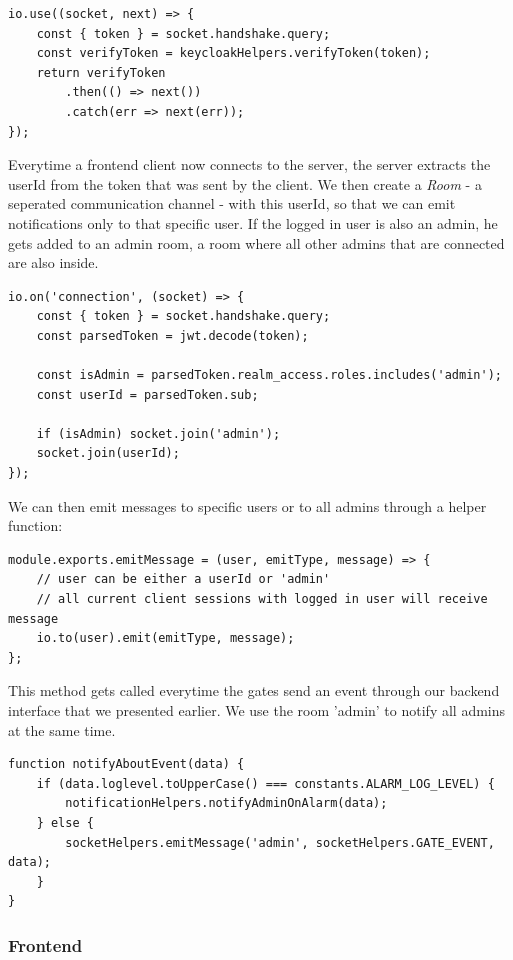 \begin{lstlisting}[label=createSocketIOMiddleware]
io.use((socket, next) => {
    const { token } = socket.handshake.query;
    const verifyToken = keycloakHelpers.verifyToken(token);
    return verifyToken
        .then(() => next())
        .catch(err => next(err));
});
\end{lstlisting}

Everytime a frontend client now connects to the server, the server extracts the userId from the token that was sent by the client. We then create a \emph{Room}\cite{socketio:rooms} - a seperated communication channel - with this userId, so that we can emit notifications only to that specific user. If the logged in user is also an admin, he gets added to an admin room, a room where all other admins that are connected are also inside.

\begin{lstlisting}[label=onConnection]
io.on('connection', (socket) => {
	const { token } = socket.handshake.query;
	const parsedToken = jwt.decode(token);

	const isAdmin = parsedToken.realm_access.roles.includes('admin');
	const userId = parsedToken.sub;

	if (isAdmin) socket.join('admin');
	socket.join(userId);
});
\end{lstlisting}

We can then emit messages to specific users or to all admins through a helper function:
\begin{lstlisting}[label=emitMessage]
module.exports.emitMessage = (user, emitType, message) => {
	// user can be either a userId or 'admin'
	// all current client sessions with logged in user will receive message
	io.to(user).emit(emitType, message);
};
\end{lstlisting}

This method gets called everytime the gates send an event through our backend interface that we presented earlier. We use the room 'admin' to notify all admins at the same time.

\begin{lstlisting}[label=socketIOBackendNotification]
function notifyAboutEvent(data) {
    if (data.loglevel.toUpperCase() === constants.ALARM_LOG_LEVEL) {
        notificationHelpers.notifyAdminOnAlarm(data);
    } else {
        socketHelpers.emitMessage('admin', socketHelpers.GATE_EVENT, data);
    }
}
\end{lstlisting}

\subsubsection{Frontend}
\label{Frontend}

